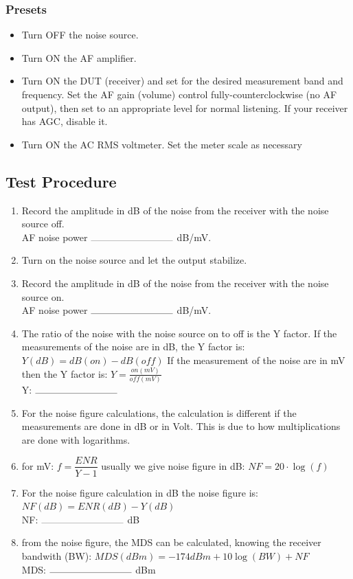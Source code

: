 \documentclass[10pt,letterpaper]{book}
\begin{document}
\subsubsection*{Presets}
\begin{itemize}
	\item Turn OFF the noise source.
	\item Turn ON the AF amplifier.
	\item Turn ON the DUT (receiver) and set for the desired measurement band and frequency. Set the AF gain (volume) control fully-counterclockwise (no AF output), then set to an appropriate level for normal listening. If your receiver has AGC, disable it.
	\item Turn ON the AC RMS voltmeter. Set the meter scale as necessary
\end{itemize}
\subsection*{Test Procedure}
\begin{enumerate}
\item  Record the amplitude in dB of the noise from the receiver with the noise source off.
	\vspace{30pt}
	\\AF noise power $\rule{3cm}{0.1mm}$ dB/mV.
	\item Turn on the noise source and let the output stabilize.
	\item Record the amplitude in dB of the noise from the receiver with the noise source on.
	\vspace{30pt}
	\\AF noise power $\rule{3cm}{0.1mm}$ dB/mV.
	\item The ratio of the noise with the noise source on to off is the Y factor. If the measurements of the noise are in dB, the Y factor is: $ Y(dB) = dB(on) - dB(off)$ If the measurement of the noise are in mV then the Y factor is: $ Y = \frac{on(mV)}{off(mV)} $
	\vspace{30pt}
	\\Y: $\rule{3cm}{0.1mm}$ 
	\item For the noise figure calculations, the calculation is different if the measurements are done in dB or in Volt. This is due to how multiplications are done with logarithms.
	\item for mV:  $ f = \dfrac{ENR}{Y-1} $ usually we give noise figure in dB: $ NF = 20 \cdot \log(f) $
	\item For the noise figure calculation in dB the noise figure is: $NF(dB) =  ENR(dB) - Y(dB) $
	\vspace{30pt}
	 \\NF: $\rule{3cm}{0.1mm}$  dB
	\item from the noise figure, the MDS can be calculated, knowing the receiver bandwith (BW): $ MDS(dBm) = -174dBm + 10 \log(BW) + NF $ 
	\vspace{30pt}
	 \\MDS: $\rule{3cm}{0.1mm}$ dBm
\end{enumerate}
\end{document}

